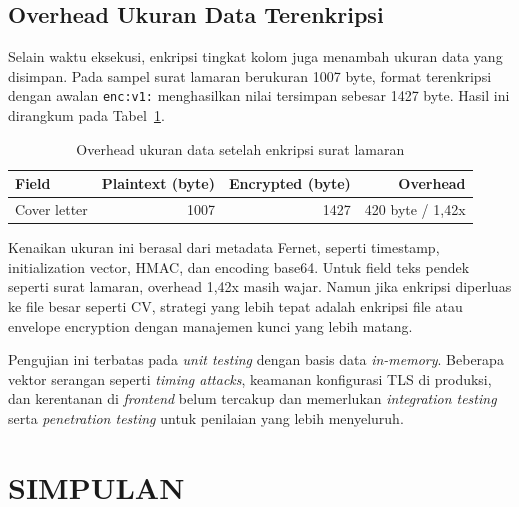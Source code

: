 \documentclass[12pt,a4paper]{article}
\begin{document}
\subsection{Overhead Ukuran Data Terenkripsi}

Selain waktu eksekusi, enkripsi tingkat kolom juga menambah ukuran data
yang disimpan. Pada sampel surat lamaran berukuran 1007 byte, format
terenkripsi dengan awalan \texttt{enc:v1:} menghasilkan nilai tersimpan
sebesar 1427 byte. Hasil ini dirangkum pada Tabel~\ref{tab:sizeoverhead}.

\begin{table}[H]
  \caption{Overhead ukuran data setelah enkripsi surat lamaran}
  \label{tab:sizeoverhead}
  \centering
  \begin{tabularx}{\textwidth}{X r r r}
    \toprule
    Field & Plaintext (byte) & Encrypted (byte) & Overhead \\
    \midrule
    Cover letter & 1007 & 1427 & 420 byte / 1,42x \\
    \bottomrule
  \end{tabularx}
\end{table}

Kenaikan ukuran ini berasal dari metadata Fernet, seperti timestamp,
initialization vector, HMAC, dan encoding base64. Untuk field teks
pendek seperti surat lamaran, overhead 1,42x masih wajar. Namun jika
enkripsi diperluas ke file besar seperti CV, strategi yang lebih tepat
adalah enkripsi file atau envelope encryption dengan manajemen kunci
yang lebih matang.

Pengujian ini terbatas pada \textit{unit testing} dengan basis data
\textit{in-memory}. Beberapa vektor serangan seperti \textit{timing
attacks}, keamanan konfigurasi TLS di produksi, dan kerentanan di
\textit{frontend} belum tercakup dan memerlukan \textit{integration
testing} serta \textit{penetration testing} untuk penilaian yang lebih
menyeluruh.

\section{SIMPULAN}
\end{document}

